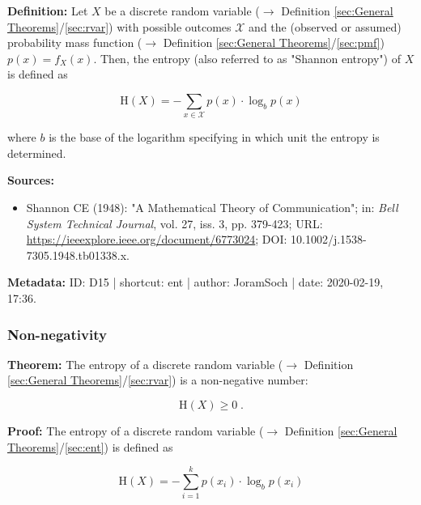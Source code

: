 \documentclass[a4paper,12pt,twoside]{book}
\begin{document}
\textbf{Definition:} Let $X$ be a discrete random variable ($\rightarrow$ Definition \ref{sec:General Theorems}/\ref{sec:rvar}) with possible outcomes $\mathcal{X}$ and the (observed or assumed) probability mass function ($\rightarrow$ Definition \ref{sec:General Theorems}/\ref{sec:pmf}) $p(x) = f_X(x)$. Then, the entropy (also referred to as "Shannon entropy") of $X$ is defined as

\begin{equation} \label{eq:ent-ent}
\mathrm{H}(X) = - \sum_{x \in \mathcal{X}} p(x) \cdot \log_b p(x)
\end{equation}

where $b$ is the base of the logarithm specifying in which unit the entropy is determined.


\vspace{1em}
\textbf{Sources:}
\begin{itemize}
\item Shannon CE (1948): "A Mathematical Theory of Communication"; in: \textit{Bell System Technical Journal}, vol. 27, iss. 3, pp. 379-423; URL: \url{https://ieeexplore.ieee.org/document/6773024}; DOI: 10.1002/j.1538-7305.1948.tb01338.x.
\end{itemize}


\vspace{1em}
\textbf{Metadata:} ID: D15 | shortcut: ent | author: JoramSoch | date: 2020-02-19, 17:36.
\vspace{1em}



\subsubsection[\textbf{Non-negativity}]{Non-negativity} \label{sec:ent-nonneg}
\setcounter{equation}{0}

\textbf{Theorem:} The entropy of a discrete random variable ($\rightarrow$ Definition \ref{sec:General Theorems}/\ref{sec:rvar}) is a non-negative number:

\begin{equation} \label{eq:ent-nonneg-ent-nonneg}
\mathrm{H}(X) \geq 0 \; .
\end{equation}


\vspace{1em}
\textbf{Proof:} The entropy of a discrete random variable ($\rightarrow$ Definition \ref{sec:General Theorems}/\ref{sec:ent}) is defined as

\begin{equation} \label{eq:ent-nonneg-ent}
\mathrm{H}(X) = - \sum_{i=1}^{k} p(x_i) \cdot \log_b p(x_i)
\end{equation}
\end{document}
